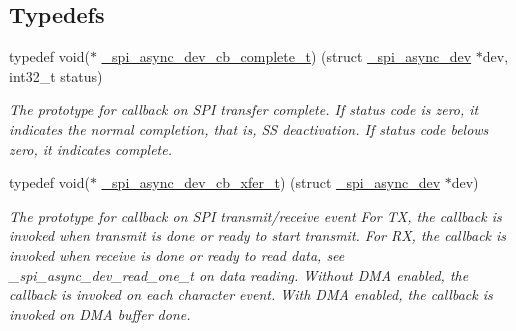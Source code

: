 \subsection*{Typedefs}
\begin{DoxyCompactItemize}
\item 
\mbox{\label{group__hpl__spi_ga446094494e8aacbf4ad1a74c868d9809}} 
typedef void($\ast$ \hyperlink{group__hpl__spi_ga446094494e8aacbf4ad1a74c868d9809}{\+\_\+spi\+\_\+async\+\_\+dev\+\_\+cb\+\_\+complete\+\_\+t}) (struct \hyperlink{struct__spi__async__dev}{\+\_\+spi\+\_\+async\+\_\+dev} $\ast$dev, int32\+\_\+t status)
\begin{DoxyCompactList}\small\item\em The prototype for callback on S\+PI transfer complete. If status code is zero, it indicates the normal completion, that is, SS deactivation. If status code belows zero, it indicates complete. \end{DoxyCompactList}\item 
\mbox{\label{group__hpl__spi_ga62275ef9b2c245ed2ed183f9d1c98a31}} 
typedef void($\ast$ \hyperlink{group__hpl__spi_ga62275ef9b2c245ed2ed183f9d1c98a31}{\+\_\+spi\+\_\+async\+\_\+dev\+\_\+cb\+\_\+xfer\+\_\+t}) (struct \hyperlink{struct__spi__async__dev}{\+\_\+spi\+\_\+async\+\_\+dev} $\ast$dev)
\begin{DoxyCompactList}\small\item\em The prototype for callback on S\+PI transmit/receive event For TX, the callback is invoked when transmit is done or ready to start transmit. For RX, the callback is invoked when receive is done or ready to read data, see \+\_\+spi\+\_\+async\+\_\+dev\+\_\+read\+\_\+one\+\_\+t on data reading. Without D\+MA enabled, the callback is invoked on each character event. With D\+MA enabled, the callback is invoked on D\+MA buffer done. \end{DoxyCompactList}\end{DoxyCompactItemize}
